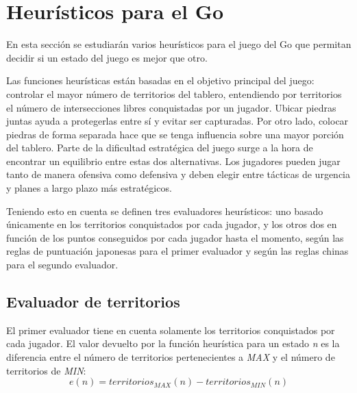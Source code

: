 \section{Heurísticos para el Go}
\label{sec:heuristicos_go}
En esta sección se estudiarán varios heurísticos para el juego del Go que permitan decidir si un estado del juego es mejor que otro.

\bigskip

Las funciones heurísticas están basadas en el objetivo principal del juego: controlar el mayor número de territorios del tablero, entendiendo por territorios el número de intersecciones libres conquistadas por un jugador.
Ubicar piedras juntas ayuda a protegerlas entre sí y evitar ser capturadas. 
Por otro lado, colocar piedras de forma separada hace que se tenga influencia sobre una mayor porción del tablero. 
Parte de la dificultad estratégica del juego surge a la hora de encontrar un equilibrio entre estas dos alternativas. 
Los jugadores pueden jugar tanto de manera ofensiva como defensiva y deben elegir entre tácticas de urgencia y planes a largo plazo más estratégicos.

Teniendo esto en cuenta se definen tres evaluadores heurísticos: uno basado únicamente en los territorios conquistados por cada jugador, y los otros dos en función de los puntos conseguidos por cada jugador hasta el momento, según las reglas de puntuación japonesas para el primer evaluador y según las reglas chinas para el segundo evaluador.

\subsection{Evaluador de territorios}
\label{ssec:evaluador_territorios}
El primer evaluador tiene en cuenta solamente los territorios conquistados por cada jugador.
El valor devuelto por la función heurística para un estado \textit{n} es la diferencia entre el número de territorios pertenecientes a \textit{MAX} y el número de territorios de \textit{MIN}:
\begin{displaymath}
e(n) = territorios_{MAX}(n) - territorios_{MIN}(n)
\end{displaymath}

